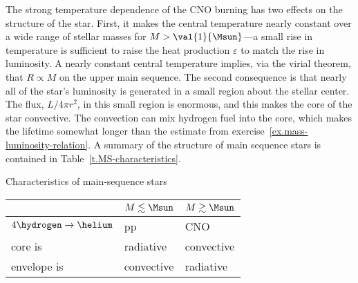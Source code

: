  The strong temperature dependence of the CNO burning has two effects on the structure of the star. First, it makes the central temperature nearly constant over a wide range of stellar masses for $M>\val{1}{\Msun}$---a small rise in temperature is sufficient to raise the heat production $\varepsilon$ to match the rise in luminosity. A nearly constant central temperature implies, via the virial theorem, that $R \propto M$ on the upper main sequence. The second consequence is that nearly all of the star's luminosity is generated in a small region about the stellar center. The flux, $L/4\pi r^{2}$, in this small region is enormous, and this makes the core of the star convective. The convection can mix hydrogen fuel into the core, which makes the lifetime somewhat longer than the estimate from exercise~\ref{ex.mass-luminosity-relation}. A summary of the structure of main sequence stars is contained in Table~\ref{t.MS-characteristics}.
\begin{margintable}
\caption{\label{t.MS-characteristics} Characteristics of main-sequence stars}
\centering
\begin{tabular}{lll}
 & $M\lesssim\Msun$ & $M\gtrsim\Msun$\\
\hline
$4\hydrogen\to\helium$ & pp & CNO\\
core is & radiative  & convective\\
envelope is & convective & radiative\\
\end{tabular}
\end{margintable}


